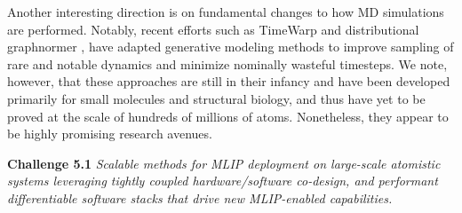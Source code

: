 Another interesting direction is on fundamental changes to how MD simulations are performed. Notably, recent efforts such as TimeWarp \cite{klein2024timewarp} and distributional graphnormer \cite{zheng2024predicting}, have adapted generative modeling methods to improve sampling of rare and notable dynamics and minimize nominally wasteful timesteps. We note, however, that these approaches are still in their infancy and have been developed primarily for small molecules and structural biology, and thus have yet to be proved at the scale of hundreds of millions of atoms. Nonetheless, they appear to be highly promising research avenues.

\textbf{Challenge 5.1} \textit{Scalable methods for MLIP deployment on large-scale atomistic systems leveraging tightly coupled hardware/software co-design, and performant differentiable software stacks that drive new MLIP-enabled capabilities.}



